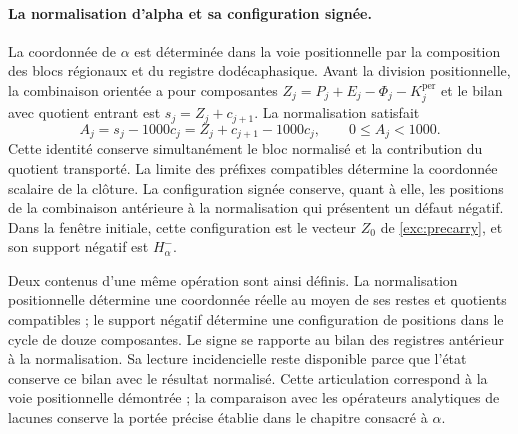 \paragraph{La normalisation d'alpha et sa configuration signée.}
\label{inc-ampl-clausura}
La coordonnée de $\alpha$ est déterminée dans la voie positionnelle par la composition des blocs régionaux et du registre dodécaphasique. Avant la division positionnelle, la combinaison orientée a pour composantes $Z_j=P_j+E_j-\Phi_j-K_j^{\mathrm{per}}$ et le bilan avec quotient entrant est $s_j=Z_j+c_{j+1}$. La normalisation satisfait
\begin{equation}
 A_j=s_j-1000c_j=Z_j+c_{j+1}-1000c_j,\qquad 0\leq A_j<1000.
 \label{inc-ampl-normalizacion}
\end{equation}
Cette identité conserve simultanément le bloc normalisé et la
contribution du quotient transporté. La limite des préfixes
compatibles détermine la coordonnée scalaire de la clôture. La
configuration signée conserve, quant à elle, les positions de la
combinaison antérieure à la normalisation qui présentent un défaut négatif.
Dans la fenêtre initiale, cette configuration est le vecteur $Z_0$ de
\eqref{exc:precarry}, et son support négatif est $H^-_\alpha$.

Deux contenus d'une même opération sont ainsi définis. La
normalisation positionnelle détermine une coordonnée réelle au moyen de ses
restes et quotients compatibles ; le support négatif détermine une
configuration de positions dans le cycle de douze composantes. Le signe
se rapporte au bilan des registres antérieur à la normalisation. Sa lecture
incidencielle reste disponible parce que l'état conserve ce bilan
avec le résultat normalisé. Cette articulation correspond à la
voie positionnelle démontrée ; la comparaison avec les opérateurs analytiques
de lacunes conserve la portée précise établie dans le chapitre
consacré à $\alpha$.
